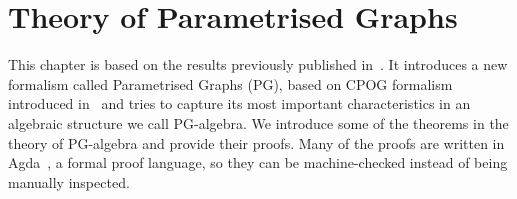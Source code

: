 

\usepackage{amstext}
\usepackage{amssymb}
\usepackage{stmaryrd}


\newcommand{\redFG}[1]{\textcolor[rgb]{0.6,0,0}{#1}}
\newcommand{\greenFG}[1]{\textcolor[rgb]{0,0.4,0}{#1}}
\newcommand{\blueFG}[1]{\textcolor[rgb]{0,0,0.8}{#1}}
\newcommand{\orangeFG}[1]{\textcolor[rgb]{0.8,0.4,0}{#1}}
\newcommand{\purpleFG}[1]{\textcolor[rgb]{0.4,0,0.4}{#1}}
\newcommand{\yellowFG}[1]{\textcolor{yellow}{#1}}
\newcommand{\brownFG}[1]{\textcolor[rgb]{0.5,0.2,0.2}{#1}}
\newcommand{\blackFG}[1]{\textcolor[rgb]{0,0,0}{#1}}
\newcommand{\whiteFG}[1]{\textcolor[rgb]{1,1,1}{#1}}
\newcommand{\yellowBG}[1]{\colorbox[rgb]{1,1,0.2}{#1}}
\newcommand{\brownBG}[1]{\colorbox[rgb]{1.0,0.7,0.4}{#1}}

\newcommand{\ColourStuff}{
  \newcommand{\red}{\redFG}
  \newcommand{\green}{\greenFG}
  \newcommand{\blue}{\blueFG}
  \newcommand{\orange}{\orangeFG}
  \newcommand{\purple}{\purpleFG}
  \newcommand{\yellow}{\yellowFG}
  \newcommand{\brown}{\brownFG}
  \newcommand{\black}{\blackFG}
  \newcommand{\white}{\whiteFG}
}

\newcommand{\MonochromeStuff}{
  \newcommand{\red}{\blackFG}
  \newcommand{\green}{\blackFG}
  \newcommand{\blue}{\blackFG}
  \newcommand{\orange}{\blackFG}
  \newcommand{\purple}{\blackFG}
  \newcommand{\yellow}{\blackFG}
  \newcommand{\brown}{\blackFG}
  \newcommand{\black}{\blackFG}
  \newcommand{\white}{\blackFG}
}

\MonochromeStuff

\newcommand{\K}[1]{\yellow{\mathsf{#1}}}
\newcommand{\Q}[1]{\green{\mathsf{#1}}}
\newcommand{\D}[1]{\blue{\mathsf{#1}}}
\newcommand{\C}[1]{\red{\mathsf{#1}}}
\newcommand{\F}[1]{\green{\mathsf{#1}}}
\newcommand{\V}[1]{\purple{\mathit{#1}}}

\newcommand{\dfeq}{\overset{\mathrm{df}}{=}}


\chapter{Theory of Parametrised Graphs}

This chapter is based on the results previously published in~\cite{pg_algebra}. 
It introduces a new formalism called Parametrised Graphs (PG), 
based on CPOG formalism introduced in~\cite{2010_mokhov_ieee} and tries to capture its 
most important characteristics in an algebraic structure we call PG-algebra.
We introduce some of the theorems in the theory of PG-algebra and provide their proofs.
Many of the proofs are written in Agda~\cite{norell:thesis}, a formal proof language,
so they can be machine-checked instead of being manually inspected.

